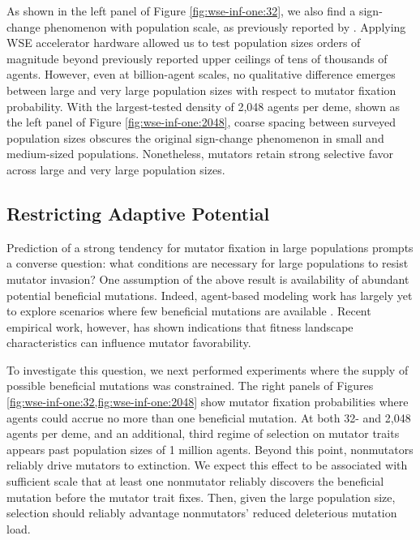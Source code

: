 As shown in the left panel of Figure \ref{fig:wse-inf-one:32}, we also find a sign-change phenomenon with population scale, as previously reported by \citet{raynes2018sign}.
Applying WSE accelerator hardware allowed us to test population sizes orders of magnitude beyond previously reported upper ceilings of tens of thousands of agents.
However, even at billion-agent scales, no qualitative difference emerges between large and very large population sizes with respect to mutator fixation probability.
With the largest-tested density of 2,048 agents per deme, shown as the left panel of Figure \ref{fig:wse-inf-one:2048}, coarse spacing between surveyed population sizes obscures the original sign-change phenomenon in small and medium-sized populations.
Nonetheless, mutators retain strong selective favor across large and very large population sizes.

\subsection{Restricting Adaptive Potential}
\label{sec:restricting-adaptive-potential}

Prediction of a strong tendency for mutator fixation in large populations prompts a converse question: what conditions are necessary for large populations to resist mutator invasion?
One assumption of the above result is availability of abundant potential beneficial mutations.
Indeed, agent-based modeling work has largely yet to explore scenarios where few beneficial mutations are available \citep{raynes2013effect,raynes2018sign,raynes2019selection,raynes2019migration}.
Recent empirical work, however, has shown indications that fitness landscape characteristics can influence mutator favorability.

To investigate this question, we next performed experiments where the supply of possible beneficial mutations was constrained.
The right panels of Figures \cref{fig:wse-inf-one:32,fig:wse-inf-one:2048} show mutator fixation probabilities where agents could accrue no more than one beneficial mutation.
At both 32- and 2,048 agents per deme, and an additional, third regime of selection on mutator traits appears past population sizes of 1 million agents.
Beyond this point, nonmutators reliably drive mutators to extinction.
We expect this effect to be associated with sufficient scale that at least one nonmutator reliably discovers the beneficial mutation before the mutator trait fixes.
Then, given the large population size, selection should reliably advantage nonmutators' reduced deleterious mutation load.

